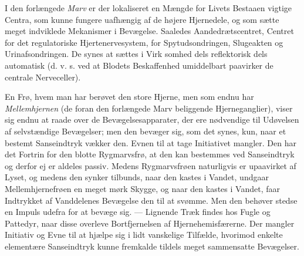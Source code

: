\documentclass[12pt,a4paper,openany]{book}
\newcommand{\opage}[1]{\marginnote{\footnotesize\textit{[#1]}}}
\begin{document}
I den forlængede \emph{Marv} er der lokaliseret en Mængde for Livets
Bestaaen vigtige Centra, som kunne fungere uafhængig af de højere
Hjernedele, og som sætte meget indviklede Mekanismer i Bevægelse.
Saaledes Aandedrætscentret, Centret for det regulatoriske
Hjertenervesystem, for Spytudsondringen, Slugeakten og Urinafsondringen.
De synes at sættes i Virk%
\opage{48}somhed dels reflektorisk dels automatisk (d. v. s. ved at
Blodets Beskaffenhed umiddelbart paavirker de centrale Nerveceller).

En Frø, hvem man har berøvet den store Hjerne, men som endnu har
\emph{Mellemhjernen} (de foran den forlængede Marv beliggende
Hjerneganglier), viser sig endnu at raade over de Bevægelsesapparater,
der ere nødvendige til Udøvelsen af selvstændige Bevægelser; men den
bevæger sig, som det synes, kun, naar et bestemt Sanseindtryk vækker
den. Evnen til at tage Initiativet mangler. Den har det Fortrin for den
blotte Rygmarvsfrø, at den kan bestemmes ved Sanseindtryk og derfor ej
er aldeles passiv. Medens Rygmarvsfrøen naturligvis er upaavirket af
Lyset, og medens den synker tilbunds, naar den kastes i Vandet, undgaar
Mellemhjernefrøen en meget mørk Skygge, og naar den kastes i Vandet,
faar Indtrykket af Vanddelenes Bevægelse den til at svømme. Men den
behøver stedse en Impuls udefra for at bevæge sig. --- Lignende Træk
findes hos Fugle og Pattedyr, naar disse overleve Bortfjernelsen af
Hjernehemisfærerne. Der mangler Initiativ og Evne til at hjælpe sig i
lidt vanskelige Tilfælde, hvorimod enkelte elementære Sanseindtryk kunne
fremkalde tildels meget sammensatte Bevægelser.
\end{document}
